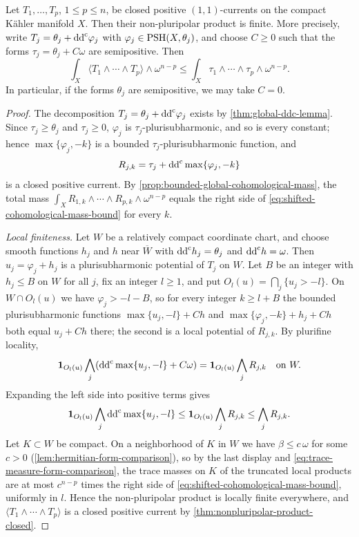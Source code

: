 \begin{theorem}\label{thm:compact-nonpluripolar-finiteness}
Let $T_1,\ldots,T_p$, $1\leq p\leq n$, be closed positive $(1,1)$-currents on the compact K\"ahler manifold $X$. Then their non-pluripolar product is finite. More precisely, write $T_j=\theta_j+\mathrm{dd}^{\mathrm{c}}\varphi_j$ with $\varphi_j\in\mathrm{PSH}(X,\theta_j)$, and choose $C\geq0$ such that the forms $\tau_j=\theta_j+C\omega$ are semipositive. Then
\begin{equation}\label{eq:shifted-cohomological-mass-bound}
 \int_X\langle T_1\wedge\cdots\wedge T_p\rangle\wedge\omega^{n-p}
       \leq\int_X\tau_1\wedge\cdots\wedge\tau_p\wedge\omega^{n-p}.
\end{equation}
In particular, if the forms $\theta_j$ are semipositive, we may take $C=0$.
\end{theorem}
\begin{proof}
The decomposition $T_j=\theta_j+\mathrm{dd}^{\mathrm{c}}\varphi_j$ exists by \cref{thm:global-ddc-lemma}. Since $\tau_j\geq\theta_j$ and $\tau_j\geq0$, $\varphi_j$ is $\tau_j$-plurisubharmonic, and so is every constant; hence $\max\{\varphi_j,-k\}$ is a bounded $\tau_j$-plurisubharmonic function, and
\[
 R_{j,k}=\tau_j+\mathrm{dd}^{\mathrm{c}}\max\{\varphi_j,-k\}
\]
is a closed positive current. By \cref{prop:bounded-global-cohomological-mass}, the total mass $\int_XR_{1,k}\wedge\cdots\wedge R_{p,k}\wedge\omega^{n-p}$ equals the right side of \eqref{eq:shifted-cohomological-mass-bound} for every $k$.

\emph{Local finiteness.} Let $W$ be a relatively compact coordinate chart, and choose smooth functions $h_j$ and $h$ near $\overline W$ with $\mathrm{dd}^{\mathrm{c}} h_j=\theta_j$ and $\mathrm{dd}^{\mathrm{c}} h=\omega$. Then $u_j=\varphi_j+h_j$ is a plurisubharmonic potential of $T_j$ on $W$. Let $B$ be an integer with $h_j\leq B$ on $W$ for all $j$, fix an integer $l\geq1$, and put $O_l(u)=\bigcap_j\{u_j>-l\}$. On $W\cap O_l(u)$ we have $\varphi_j>-l-B$, so for every integer $k\geq l+B$ the bounded plurisubharmonic functions $\max\{u_j,-l\}+Ch$ and $\max\{\varphi_j,-k\}+h_j+Ch$ both equal $u_j+Ch$ there; the second is a local potential of $R_{j,k}$. By plurifine locality,
\[
 \mathbf1_{O_l(u)}\bigwedge_j(\mathrm{dd}^{\mathrm{c}}\max\{u_j,-l\}+C\omega)=\mathbf1_{O_l(u)}\bigwedge_jR_{j,k}\quad\text{on }W.
\]
Expanding the left side into positive terms gives
\[
 \mathbf1_{O_l(u)}\bigwedge_j\mathrm{dd}^{\mathrm{c}}\max\{u_j,-l\}
       \leq\mathbf1_{O_l(u)}\bigwedge_j R_{j,k}\leq\bigwedge_jR_{j,k}.
\]
Let $K\subset W$ be compact. On a neighborhood of $K$ in $W$ we have $\beta\leq c\,\omega$ for some $c>0$ (\cref{lem:hermitian-form-comparison}), so by the last display and \eqref{eq:trace-measure-form-comparison}, the trace masses on $K$ of the truncated local products are at most $c^{n-p}$ times the right side of \eqref{eq:shifted-cohomological-mass-bound}, uniformly in $l$. Hence the non-pluripolar product is locally finite everywhere, and $\langle T_1\wedge\cdots\wedge T_p\rangle$ is a closed positive current by \cref{thm:nonpluripolar-product-closed}.


\end{proof}
